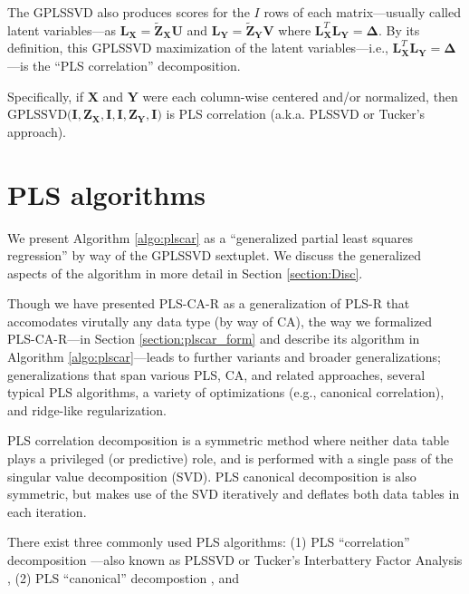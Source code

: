 \documentclass[12pt]{article}
\begin{document}
The GPLSSVD also produces scores for the \(I\) rows of each
matrix---usually called latent variables---as
\({\mathbf L}_{\mathbf X} = \widetilde{\mathbf Z}_{\mathbf X}{\mathbf U}\)
and
\({\mathbf L}_{\mathbf Y} = \widetilde{\mathbf Z}_{\mathbf Y}{\mathbf V}\)
where
\({\mathbf L}_{\mathbf X}^{T} {\mathbf L}_{\mathbf Y} = {\boldsymbol \Delta}\).
By its definition, this GPLSSVD maximization of the latent
variables---i.e.,
\({\mathbf L}_{\mathbf X}^{T} {\mathbf L}_{\mathbf Y} = {\boldsymbol \Delta}\)---is
the ``PLS correlation'' decomposition.

Specifically, if \({\mathbf X}\) and \({\mathbf Y}\) were each
column-wise centered and/or normalized, then
\(\mathrm{GPLSSVD(} {\mathbf I}, {\mathbf Z}_{\mathbf X}, {\mathbf I}, {\mathbf I}, {\mathbf Z}_{\mathbf Y}, {\mathbf I} \mathrm{)}\)
is PLS correlation (a.k.a. PLSSVD or Tucker's approach).

\hypertarget{pls-algorithms}{%
\section{PLS algorithms}\label{pls-algorithms}}

We present Algorithm \ref{algo:plscar} as a ``generalized partial least
squares regression'' by way of the GPLSSVD sextuplet. We discuss the
generalized aspects of the algorithm in more detail in Section
\ref{section:Disc}.

Though we have presented PLS-CA-R as a generalization of PLS-R that
accomodates virutally any data type (by way of CA), the way we
formalized PLS-CA-R---in Section \ref{section:plscar_form} and describe
its algorithm in Algorithm \ref{algo:plscar}---leads to further variants
and broader generalizations; generalizations that span various PLS, CA,
and related approaches, several typical PLS algorithms, a variety of
optimizations (e.g., canonical correlation), and ridge-like
regularization.

PLS correlation decomposition is a symmetric method where neither data
table plays a privileged (or predictive) role, and is performed with a
single pass of the singular value decomposition (SVD). PLS canonical
decomposition is also symmetric, but makes use of the SVD iteratively
and deflates both data tables in each iteration.

There exist three commonly used PLS algorithms: (1) PLS ``correlation''
decomposition
\citep{krishnan_partial_2011, bookstein1994partial, mcintosh_spatial_1996}---also
known as PLSSVD \citep{tenenhaus_regression_1998} or Tucker's
Interbattery Factor Analysis \citep{tucker_inter-battery_1958}, (2) PLS
``canonical'' decompostion \citep{tenenhaus_regression_1998}, and
\end{document}
